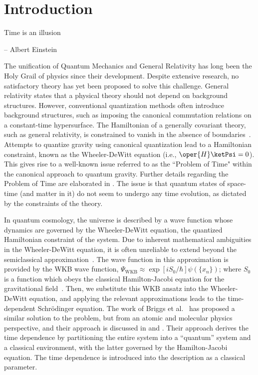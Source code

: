 \chapter{Introduction\label{chap:introduction}}

\epigraph{ \myopeningquote Time is an illusion \myclosingquote}{-- Albert Einstein}

The unification of Quantum Mechanics and General Relativity has long been the Holy Grail of physics 
since their development. Despite extensive research, no satisfactory theory has yet been proposed 
to solve this challenge. General relativity states that a physical theory should not depend on 
background structures. However, conventional quantization methods often introduce background structures, 
such as imposing the canonical commutation relations on a constant-time hypersurface. The Hamiltonian 
of a generally covariant theory, such as general relativity, is constrained to vanish in the absence 
of boundaries~\cite{gielen2023quantum}. Attempts to quantize gravity using canonical quantization 
lead to a Hamiltonian constraint, known as the Wheeler-DeWitt equation (i.e., \(\oper{H} \ketPsi = 0\)). 
This gives rise to a well-known issue referred to as the ``Problem of Time" within the canonical 
approach to quantum gravity. Further details regarding the Problem of Time are elaborated in 
. The issue is that quantum 
states of space-time (and matter in it) do not seem to undergo any time evolution, as dictated by 
the constraints of the theory.

In quantum cosmology, the universe is described by a wave function whose dynamics are governed 
by the Wheeler-DeWitt equation, the quantized Hamiltonian constraint of the system. Due to inherent 
mathematical ambiguities in the Wheeler-DeWitt equation, it is often unreliable to extend beyond the 
semiclassical approximation~\cite{cooke2010qcintro}. The wave function in this approximation is provided 
by the WKB wave function, \(\Psi_{\mathrm{WKB}} 
\approx \exp\left[iS_0/\hbar\right]\psi(\{x_n\})\); where \(S_0\) is a function which obeys the classical
Hamilton-Jacobi equation for the gravitational field~\cite{gielen2023quantum}. Then, we substitute this
WKB ansatz into the Wheeler-DeWitt equation, and applying the relevant approximations leads to the 
time-dependent Schr\"odinger equation. The work of Briggs et al.~\cite{briggs2001derivation} 
has proposed a similar solution to the problem, but from an atomic and molecular physics perspective, 
and their approach is discussed in  and .
Their approach derives the time dependence by partitioning the entire system into a ``quantum'' system and a classical
environment, with the latter governed by the Hamilton-Jacobi equation. The time dependence is introduced into the
description as a classical parameter.

